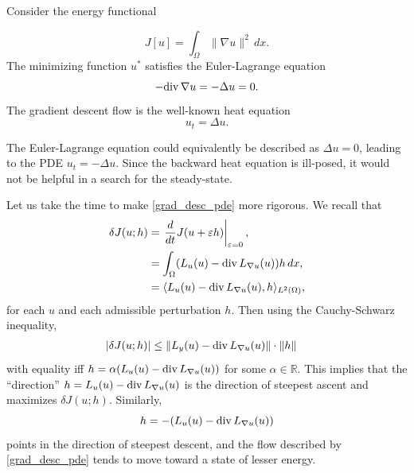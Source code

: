 \begin{flushleft}
    Consider the energy functional
\end{flushleft}
\[ J[u] = \int_{\Omega} \|\nabla u\|^2 \, dx.\]
The minimizing function $u^*$ satisfies the Euler-Lagrange equation
\[-{\rm div}\, \nabla u    = - \Delta u = 0.\]
The gradient descent flow is the well-known heat equation
\[u_t = \Delta u.\]

The Euler-Lagrange equation could equivalently be described as $\Delta u = 0$, leading to the PDE $u_t = -\Delta u$.
Since the backward heat equation is ill-posed, it would not be helpful in a search for the steady-state.

Let us take the time to make \eqref{grad_desc_pde} more rigorous.
We recall that
\begin{align*}
        \delta J(u;h) &= \left.\frac{d}{dt}J(u + \epsilon h)\right|_{\epsilon=0},\\
        &= \int_{\Omega} (L_u(u) - {\rm div}\, L_{\nabla u}(u)) h\, dx,\\
        &= \langle L_u(u) - {\rm div}\, L_{\nabla u}(u), h \rangle_{L^2(\Omega)},
\end{align*}
for each $u$ and each admissible perturbation $h$.
Then using the Cauchy-Schwarz inequality,
\begin{align*}
    |\delta J(u;h)| &\leq \|L_y(u) - {\rm div}\, L_{\nabla u}(u)\| \cdot \| h \|
\end{align*}
with equality iff $h =\alpha(L_u(u) - {\rm div}\, L_{\nabla u}(u))$ for some $\alpha \in \mathbb{R}$.
This implies that the ``direction''
$h = L_u(u) - {\rm div}\, L_{\nabla u}(u)$ is the direction of steepest ascent and
maximizes $\delta J(u;h)$.
Similarly,
\[h = -(L_u(u) - {\rm div}\, L_{\nabla u}(u))\]
 points in the direction of steepest descent, and the flow described by \eqref{grad_desc_pde} tends to move toward a state of lesser energy.


